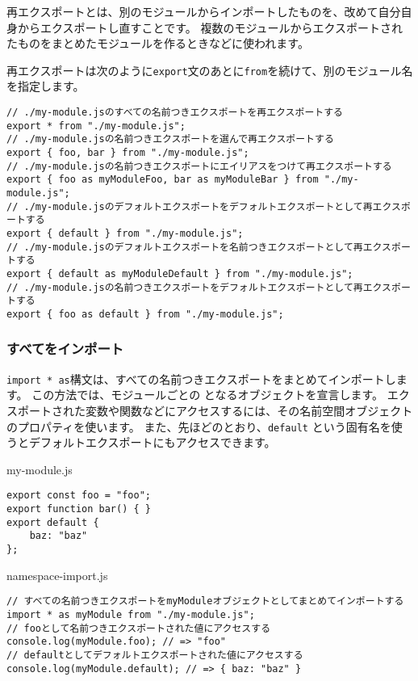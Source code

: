 再エクスポートとは、別のモジュールからインポートしたものを、改めて自分自身からエクスポートし直すことです。
複数のモジュールからエクスポートされたものをまとめたモジュールを作るときなどに使われます。

再エクスポートは次のように\texttt{export}文のあとに\texttt{from}を続けて、別のモジュール名を指定します。

\begin{lstlisting}
// ./my-module.jsのすべての名前つきエクスポートを再エクスポートする
export * from "./my-module.js";
// ./my-module.jsの名前つきエクスポートを選んで再エクスポートする
export { foo, bar } from "./my-module.js";
// ./my-module.jsの名前つきエクスポートにエイリアスをつけて再エクスポートする
export { foo as myModuleFoo, bar as myModuleBar } from "./my-module.js";
// ./my-module.jsのデフォルトエクスポートをデフォルトエクスポートとして再エクスポートする
export { default } from "./my-module.js";
// ./my-module.jsのデフォルトエクスポートを名前つきエクスポートとして再エクスポートする
export { default as myModuleDefault } from "./my-module.js";
// ./my-module.jsの名前つきエクスポートをデフォルトエクスポートとして再エクスポートする
export { foo as default } from "./my-module.js";
\end{lstlisting}

\hypertarget{namespace-import}{%
\subsubsection{すべてをインポート}\label{namespace-import}}

\texttt{import * as}構文は、すべての名前つきエクスポートをまとめてインポートします。
この方法では、モジュールごとの \textbf{}
となるオブジェクトを宣言します。
エクスポートされた変数や関数などにアクセスするには、その名前空間オブジェクトのプロパティを使います。
また、先ほどのとおり、\texttt{default}
という固有名を使うとデフォルトエクスポートにもアクセスできます。

\begin{listtitle}
my-module.js
\end{listtitle}
\begin{lstlisting}
export const foo = "foo";
export function bar() { }
export default {
    baz: "baz"
};
\end{lstlisting}
\listend

\begin{listtitle}
namespace-import.js
\end{listtitle}
\begin{lstlisting}
// すべての名前つきエクスポートをmyModuleオブジェクトとしてまとめてインポートする
import * as myModule from "./my-module.js";
// fooとして名前つきエクスポートされた値にアクセスする
console.log(myModule.foo); // => "foo"
// defaultとしてデフォルトエクスポートされた値にアクセスする
console.log(myModule.default); // => { baz: "baz" }
\end{lstlisting}
\listend

